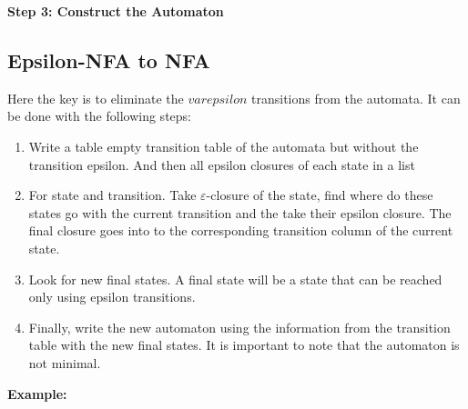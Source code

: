 \textbf{Step 3: Construct the Automaton}

\begin{center}
\end{center}

\subsection{Epsilon-NFA to NFA}

Here the key is to eliminate the \(varepsilon\) transitions from the automata. It can be done 
with the following steps:

\begin{enumerate}
     
    \item Write a table empty transition table of the automata but without the transition epsilon. And then 
          all epsilon closures of each state in a list
   
    \item For state and transition. Take \(\varepsilon\)-closure of the state, find where do
          these states go with the current transition and the take their epsilon closure. The final closure
          goes into to the corresponding transition column of the current state.
    
    \item Look for new final states. A final state will be a state that can be reached only using epsilon 
          transitions.
    
    \item Finally, write the new automaton using the information from the transition table with the new 
          final states. It is important to note that the automaton is not minimal. 

\end{enumerate}

\textbf{Example:}

